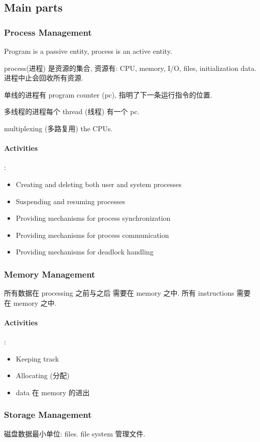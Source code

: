 \subsection{Main parts}
\subsubsection{Process Management}
Program is a passive entity, process is an active entity. 

process(进程) 是资源的集合, 资源有: CPU, memory, I/O, files, initialization data. 进程中止会回收所有资源. 

单线的进程有 program counter (pc), 指明了下一条运行指令的位置. 

多线程的进程每个 thread (线程) 有一个 pc. 

multiplexing (多路复用) the CPUs.

\paragraph*{Activities}:
\begin{itemize}\small
    \item Creating and deleting both user and system processes
    \item Suspending and resuming processes
    \item Providing mechanisms for process synchronization
    \item Providing mechanisms for process communication
    \item Providing mechanisms for deadlock handling    
\end{itemize}

\subsubsection{Memory Management}
所有数据在 processing 之前与之后 需要在 memory 之中. 所有 instructions 需要在 memory 之中. 

\paragraph*{Activities}:
\begin{itemize}\small
    \item Keeping track
    \item Allocating (分配)
    \item data 在 memory 的进出
\end{itemize}

\subsubsection{Storage Management}
磁盘数据最小单位: files. file system 管理文件. 


